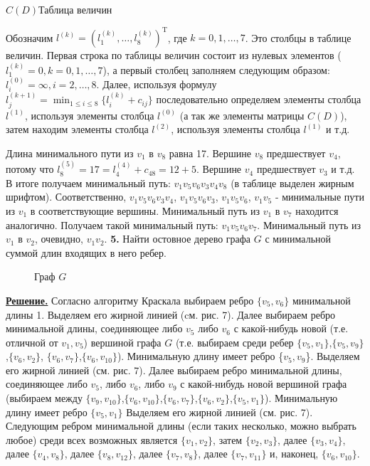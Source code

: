 \documentclass[12pt, letterpaper, titlepage]{article}
\begin{document}
\hspace{3.5cm}$C(D)$\hspace{6.5cm}Таблица величин

Обозначим $l^{(k)}=(l_1^{(k)},\dots,l_8^{(k)})^\mathrm{T}$, где $k=0,1,\dots,7$. Это столбцы в
таблице величин. Первая строка по таблицы величин состоит из нулевых элементов ($l^{(k)}_1=0,k=0,1,\dots,7$),
а первый столбец заполняем следующим образом: $l_i^{(0)}=\infty,i=2,\dots,8$. Далее, используя формулу
$l_j^{(k+1)}=\displaystyle\min_{1\le i\le8}\{l_i^{(k)}+c_{ij}\}$ последовательно определяем элементы столбца
$l^{(1)}$, используя элементы столбца $l^{(0)}$ (а так же элементы матрицы $C(D)$), затем находим элементы
столбца $l^{(2)}$, используя элементы столбца $l^{(1)}$ и т.д.

Длина минимального пути из $v_1$ в $v_8$ равна 17. Вершине $v_8$ предшествует $v_4$, потому что $l^{(5)}_8=17=l^{(4)}_4+c_{48}=12+5$.
Вершине $v_4$ предшествует $v_3$ и т.д. В итоге получаем минимальный путь: $v_1v_5v_6v_3v_4v_8$ (в таблице выделен жирным шрифтом). Соответственно,
$v_1v_5v_6v_3v_4$, $v_1v_5v_6v_3$, $v_1v_5v_6$, $v_1v_5$ - минимальные пути из $v_1$ в соответствующие вершины.
Минимальный путь из $v_1$ в $v_7$ находится аналогично. Получаем такой минимальный путь: $v_1v_5v_6v_7$.
Минимальный путь из $v_1$ в $v_2$, очевидно, $v_1v_2$.
\newpage
\textbf{5.}  Найти остовное дерево графа $G$ с минимальной суммой длин входящих в него ребер.
\begin{figure}[H]\centering\caption{Граф $G$}\end{figure}
\underline{\textbf{Решение.}}
Согласно алгоритму Краскала выбираем ребро $\{v_5,v_6\}$ минимальной длины 1.
Выделяем его жирной линией (cм. рис. 7). Далее выбираем ребро минимальной длины,
соединяющее либо $v_5$ либо $v_6$ с какой-нибудь новой (т.е. отличной от $v_1,v_5$) вершиной
графа $G$ (т.е. выбираем среди ребер $\{v_5,v_1\}$,$\{v_5,v_9\}$,$\{v_6,v_2\}$,
$\{v_6,v_7\}$,$\{v_6,v_{10}\}$). Минимальную длину имеет ребро \{$v_5,v_9$\}. Выделяем его жирной линией (см. рис. 7).
Далее выбираем ребро минимальной длины, соединяющее либо $v_5$, либо $v_6$, либо $v_9$ с какой-нибудь новой
вершиной графа (выбираем между $\{v_9,v_{10}\}$,$\{v_6,v_{10}\}$,$\{v_6,v_7\}$,$\{v_6,v_2\}$,$\{v_5,v_1\}$).
Минимальную длину имеет ребро $\{v_5,v_1\}$ Выделяем его жирной линией (см. рис. 7).
Следующим ребром минимальной длины (если таких несколько, можно выбрать любое) среди всех возможных является $\{v_{1},v_{2}\}$, затем $\{v_{2},v_{3}\}$,
далее $\{v_{3},v_{4}\}$, далее $\{v_4,v_8\}$, далее $\{v_8,v_{12}\}$, далее $\{v_7,v_8\}$, далее $\{v_7,v_{11}\}$ и, наконец, $\{v_6,v_{10}\}$.
\end{document}
